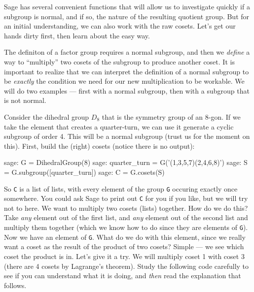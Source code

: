 Sage has several convenient functions that will allow us to investigate quickly if a subgroup is normal, and if so, the nature of the resulting quotient group.  But for an initial understanding, we can also work with the raw cosets.  Let's get our hands dirty first, then learn about the easy way.\par
%
%
The definiton of a factor group requires a normal subgroup, and then we \emph{define} a way to ``multiply'' two cosets of the subgroup to produce another coset.  It is important to realize that we can interpret the definition of a normal subgroup to be \emph{exactly} the condition we need for our new multiplication to be workable.  We will do two examples --- first with a normal subgroup, then with a subgroup that is not normal.\par
%
Consider the dihedral group $D_{8}$ that is the symmetry group of an $8$-gon.  If we take the element that creates a quarter-turn, we can use it generate a cyclic subgroup of order 4.  This will be a normal subgroup (trust us for the moment on this).  First, build the (right) cosets (notice there is no output):
%
\begin{sageexample}
sage: G = DihedralGroup(8)
sage: quarter_turn = G('(1,3,5,7)(2,4,6,8)')
sage: S = G.subgroup([quarter_turn])
sage: C = G.cosets(S)
\end{sageexample}
%
So \verb?C? is a list of lists, with every element of the group \verb?G? occuring exactly once somewhere.  You could ask Sage to print out \verb?C? for you if you like, but we will try not to here.  We want to multiply two cosets (lists) together.  How do we do this?  Take \emph{any} element out of the first list, and \emph{any} element out of the second list and multiply them together (which we know how to do since they are elements of \verb?G?).  Now we have an element of \verb?G?.  What do we do with this element, since we really want a coset as the result of the product of two cosets?  Simple --- we see which coset the product is in.  Let's give it a try.  We will multiply coset 1 with coset 3 (there are 4 cosets by Lagrange's theorem).  Study the following code carefully to see if you can understand what it is doing, and \emph{then} read the explanation that follows.
